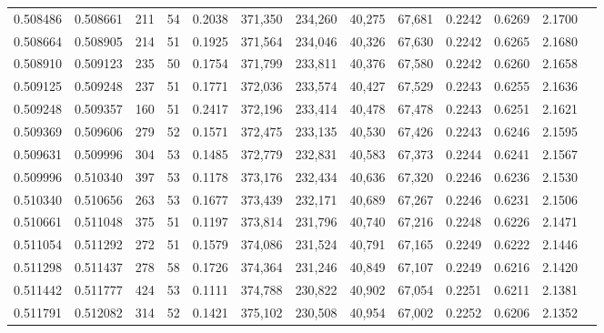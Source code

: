 \begin{tabular}{rrrrrrrrrrrrr}
0.508486 & 0.508661 &   211 &  54 &                                     0.2038 & 371,350 & 234,260 &  40,275 &  67,681 & 0.2242 & 0.6269 & 2.1700 \\
0.508664 & 0.508905 &   214 &  51 &                                     0.1925 & 371,564 & 234,046 &  40,326 &  67,630 & 0.2242 & 0.6265 & 2.1680 \\
0.508910 & 0.509123 &   235 &  50 &                                     0.1754 & 371,799 & 233,811 &  40,376 &  67,580 & 0.2242 & 0.6260 & 2.1658 \\
0.509125 & 0.509248 &   237 &  51 &                                     0.1771 & 372,036 & 233,574 &  40,427 &  67,529 & 0.2243 & 0.6255 & 2.1636 \\
0.509248 & 0.509357 &   160 &  51 &                                     0.2417 & 372,196 & 233,414 &  40,478 &  67,478 & 0.2243 & 0.6251 & 2.1621 \\
0.509369 & 0.509606 &   279 &  52 &                                     0.1571 & 372,475 & 233,135 &  40,530 &  67,426 & 0.2243 & 0.6246 & 2.1595 \\
0.509631 & 0.509996 &   304 &  53 &                                     0.1485 & 372,779 & 232,831 &  40,583 &  67,373 & 0.2244 & 0.6241 & 2.1567 \\
0.509996 & 0.510340 &   397 &  53 &                                     0.1178 & 373,176 & 232,434 &  40,636 &  67,320 & 0.2246 & 0.6236 & 2.1530 \\
0.510340 & 0.510656 &   263 &  53 &                                     0.1677 & 373,439 & 232,171 &  40,689 &  67,267 & 0.2246 & 0.6231 & 2.1506 \\
0.510661 & 0.511048 &   375 &  51 &                                     0.1197 & 373,814 & 231,796 &  40,740 &  67,216 & 0.2248 & 0.6226 & 2.1471 \\
0.511054 & 0.511292 &   272 &  51 &                                     0.1579 & 374,086 & 231,524 &  40,791 &  67,165 & 0.2249 & 0.6222 & 2.1446 \\
0.511298 & 0.511437 &   278 &  58 &                                     0.1726 & 374,364 & 231,246 &  40,849 &  67,107 & 0.2249 & 0.6216 & 2.1420 \\
0.511442 & 0.511777 &   424 &  53 &                                     0.1111 & 374,788 & 230,822 &  40,902 &  67,054 & 0.2251 & 0.6211 & 2.1381 \\
0.511791 & 0.512082 &   314 &  52 &                                     0.1421 & 375,102 & 230,508 &  40,954 &  67,002 & 0.2252 & 0.6206 & 2.1352 \\

\end{tabular}
